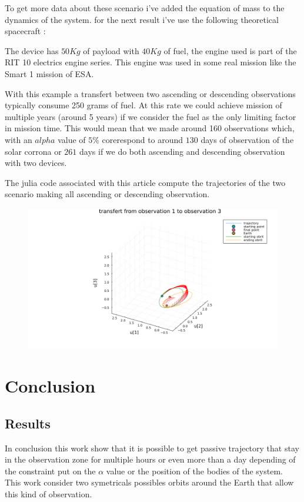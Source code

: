 \documentclass[11pt]{article} %
\begin{document}
			To get more data about these scenario i've added the equation of mass to the dynamics of the system. for the next result i've use the following theoretical spacecraft : 
			
			The device has $50Kg$ of payload with $40Kg$ of fuel, the engine used is part of the RIT 10 electrics engine series. This engine was used in some real mission like the Smart 1 mission of ESA.
			
			With this example a transfert between two ascending or descending observations typically consume 250 grams of fuel. At this rate we could achieve mission of multiple years (around 5 years) if we consider the fuel as the only limiting factor in mission time. This would mean that we made around 160 observations which, with an $alpha$ value of $5\%$ corerespond to around $130$ days of observation of the solar corrona or $261$ days if we do both ascending and descending observation with two devices.
			
			The julia code associated with this article compute the trajectories of the two scenario making all ascending or descending observation.
			
			\begin{figure}[h]
				\includegraphics[width=1\textwidth]{images/Transfert.png}
			\end{figure}
			 
			 
			 \section{Conclusion}
			 
			 \subsection{Results}
			 
			 In conclusion this work show that it is possible to get passive trajectory that stay in the observation zone for multiple hours or even more than a day depending of the constraint put on the $\alpha$ value or the position of the bodies of the system. This work consider two symetricals possibles orbits around the Earth that allow this kind of observation.
			 
\end{document}
